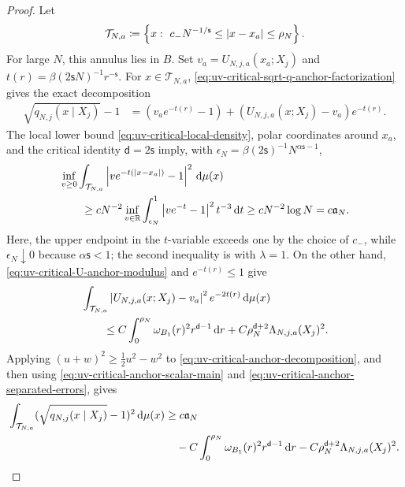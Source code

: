 \documentclass[11pt,reqno]{amsart}
\numberwithin{equation}{section}
\theoremstyle{plain}
\theoremstyle{remark}
\DeclarePairedDelimiter{\pa}{\lparen}{\rparen}
\DeclarePairedDelimiter{\abs}{\lvert}{\rvert}
\renewcommand{\d}{\mathsf{d}}
\newcommand{\md}{\mathrm{d}}
\newcommand{\R}{{\mathbb{R}}}
\newcommand{\be}{\beta}
\newcommand{\s}{\mathsf{s}}
\begin{document}
\begin{proof}
Let
\begin{align}\label{eq:uv-critical-anchor-annulus}
 \mathcal T_{N,a}
 \coloneqq
 \left\{x:\ c_-N^{-1/\s}\le\abs{x-x_a}\le\rho_N\right\}.
\end{align}
For large \(N\), this annulus lies in \(B\).  Set
\(v_a=U_{N,j,a}(x_a;X_j)\) and \(t(r)=\be(2\s N)^{-1}r^{-\s}\).  For \(x\in\mathcal T_{N,a}\), \eqref{eq:uv-critical-sqrt-q-anchor-factorization} gives the exact decomposition
\begin{align}
 \sqrt{q_{N,j}(x\mid X_j)}-1
 &=\left(v_ae^{-t(r)}-1\right)
 +\left(U_{N,j,a}(x;X_j)-v_a\right)e^{-t(r)}.
 \label{eq:uv-critical-anchor-decomposition}
\end{align}
The local lower bound \eqref{eq:uv-critical-local-density}, polar coordinates around \(x_a\), and the critical identity \(\d=2\s\) imply, with
\(\epsilon_N=\be(2\s)^{-1}N^{\alpha\s-1}\),
\begin{align}
 &\inf_{v\ge0}\int_{\mathcal T_{N,a}}
 \left|ve^{-t(\abs{x-x_a})}-1\right|^2\,\md\mu(x)\notag\\
 &\qquad\ge cN^{-2}\inf_{v\in\R}
 \int_{\epsilon_N}^1\left|ve^{-t}-1\right|^2t^{-3}\,\md t
 \ge cN^{-2}\log N
 =c\mathfrak a_N.
 \label{eq:uv-critical-anchor-scalar-main}
\end{align}
Here, the upper endpoint in the \(t\)-variable exceeds one by the choice of \(c_-\), while \(\epsilon_N\downarrow0\) because \(\alpha\s<1\); the second inequality is  with \(\lambda=1\).  On the other hand, \eqref{eq:uv-critical-U-anchor-modulus} and \(e^{-t(r)}\le1\) give
\begin{align}
 &\int_{\mathcal T_{N,a}}
 \left|U_{N,j,a}(x;X_j)-v_a\right|^2e^{-2t(r)}\,\md\mu(x)\notag\\
 &\qquad\le C\int_0^{\rho_N}\omega_{B_1}(r)^2r^{\d-1}\,\md r
 +C\rho_N^{\d+2}\Lambda_{N,j,a}(X_j)^2.
 \label{eq:uv-critical-anchor-separated-errors}
\end{align}
Applying \((u+w)^2\ge\frac12u^2-w^2\) to \eqref{eq:uv-critical-anchor-decomposition}, and then using \eqref{eq:uv-critical-anchor-scalar-main} and \eqref{eq:uv-critical-anchor-separated-errors}, gives
\begin{align}
 \int_{\mathcal T_{N,a}}\pa{\sqrt{q_{N,j}(x\mid X_j)}-1}^2\,\md\mu(x)
 &\ge c\mathfrak a_N\notag\\
 &\quad-C\int_0^{\rho_N}\omega_{B_1}(r)^2r^{\d-1}\,\md r
 -C\rho_N^{\d+2}\Lambda_{N,j,a}(X_j)^2.
 \label{eq:uv-critical-anchor-deficit-with-errors}
\end{align}

\end{proof}
\end{document}
